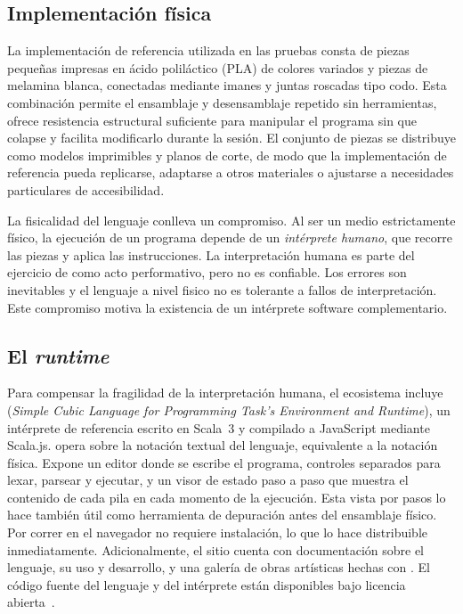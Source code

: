 \subsection{Implementaci\'on f\'isica}
\label{sec:methodology:implementation}

La implementaci\'on de referencia utilizada en las pruebas consta de
piezas peque\~nas impresas en \'acido polil\'actico (PLA) de
colores variados y piezas de melamina blanca, conectadas mediante imanes
y juntas roscadas tipo codo. Esta combinaci\'on permite el ensamblaje y
desensamblaje repetido sin herramientas, ofrece resistencia estructural
suficiente para manipular el programa sin que colapse y facilita modificarlo
durante la sesi\'on. El conjunto de piezas se distribuye como modelos
imprimibles y planos de corte, de modo que la implementaci\'on de
referencia pueda replicarse, adaptarse a otros materiales o ajustarse a
necesidades particulares de accesibilidad.

La fisicalidad del lenguaje conlleva un compromiso. Al ser un medio
estrictamente f\'isico, la ejecuci\'on de un programa \sculpt depende
de un \emph{int\'erprete humano}, que recorre las piezas y aplica las
instrucciones. La interpretaci\'on humana es parte del ejercicio de
\sculpt como acto performativo, pero no es confiable. Los errores son
inevitables y el lenguaje a nivel fisico no es tolerante a fallos de
interpretaci\'on. Este compromiso motiva la existencia de un
int\'erprete software complementario.

\subsection{El \emph{runtime} \sculpter}
\label{sec:methodology:runtime}

Para compensar la fragilidad de la interpretaci\'on humana, el
ecosistema incluye \sculpter (\emph{Simple Cubic Language for Programming
Task's Environment and Runtime}), un int\'erprete de referencia escrito
en Scala~3 y compilado a JavaScript mediante Scala.js. \sculpter opera
sobre la notaci\'on textual del lenguaje, equivalente a la notaci\'on
f\'isica. Expone un editor donde se escribe el programa, controles separados para lexar,
parsear y ejecutar, y un visor de estado paso a paso que muestra el
contenido de cada pila en cada momento de la ejecuci\'on. 
Esta vista por pasos lo hace tambi\'en \'util como herramienta de depuraci\'on antes
del ensamblaje f\'isico. Por correr en el navegador no requiere
instalaci\'on, lo que lo hace distribuible inmediatamente. 
Adicionalmente, el sitio cuenta con documentaci\'on sobre el lenguaje, su uso y
desarrollo, y una galería de obras art\'isticas hechas con \sculpt.
El c\'odigo fuente del lenguaje y del int\'erprete est\'an disponibles bajo licencia
abierta~\cite{sculpt-repo,sculpter-repo}.


